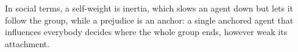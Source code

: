  In social
terms, a self-weight is inertia, which slows an agent down but lets it follow the group,
while a prejudice is an anchor: a single anchored agent that influences everybody decides
where the whole group ends, however weak its attachment.
%
%

